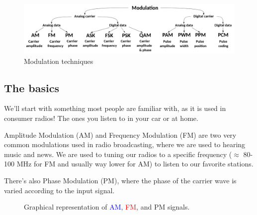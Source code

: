 \begin{figure}[h]
    \centering
    \includegraphics[width=\textwidth]{assets/osi/physical/signals/modulation.png}
    \caption{Modulation techniques}\label{fig:modulation_techniques}
\end{figure}

\subsection{The basics}
We'll start with something most people are familiar with, as it is used in consumer radios! The ones you listen to in your car or at home.

Amplitude Modulation (AM) and Frequency Modulation (FM) are two very common modulations used in radio broadcasting, where we are used to hearing music and news. We are used to tuning our radios to a specific frequency ($\approx$ 80-100 MHz for FM and usually way lower for AM) to listen to our favorite stations.

There's also Phase Modulation (PM), where the phase of the carrier wave is varied according to the input signal.
\begin{figure}[h]
    \centering
    \caption{Graphical representation of \textcolor{blue}{AM}, \textcolor{red}{FM}, and \textcolor{green!50!black}{PM} signals.}\label{fig:modulation_math}
\end{figure}


